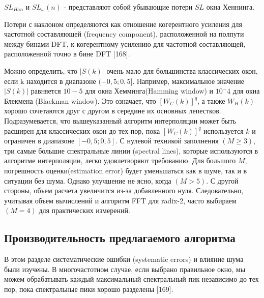 $S L_{Han}$ и $S L_\omega(n)$ - представляют собой убывающие потери $SL$ окна Хеннинга.

Потери с наклоном определяются как отношение когерентного усиления для частотной составляющей (frequency component), расположенной на полпути между бинами DFT, к когерентному усилению для частотной составляющей, расположенной точно в бине DFT [168].


Можно определить, что $|S(k)|$ очень мало 
для большинства классических окон, если k находится в диапазоне  $(-0,5;0,5]$. 
Например, максимальное значение $|S(k)|$ равняется $10-5$ для окна Хемминга(Hamming window) и $10^-4$ для окна Блекмена (Blackman window).
Это означает, что $[W_C (k)]^q$, а также $W_H (k)$ хорошо сочетаются друг с другом в середине их основных лепестков. 
Подразумевается, что вышеуказанный алгоритм интерполяции может быть расширен для классических окон до тех пор, пока $[W_C (k)]^q$ используется $k$ и ограничен в диапазоне $[-0,5;0,5]$. 
С нулевой техникой заполнения $(M\geq3)$, три самые большие спектральные линии (spectral lines), которые используются в алгоритме интерполяции, легко удовлетворяют требованию. Для большого $M$, погрешность оценки(estimation error) будет уменьшаться как в шуме, так и в ситуации без шума. Однако улучшение не ясно, когда $(M>5)$. С другой стороны, объем расчета увеличится из-за добавленного нуля. Следовательно, учитывая объем вычислений и алгоритм FFT для radix-2, часто выбираем $(M=4)$ для практических измерений.

\subsection{Производительность предлагаемого алгоритма
} \label{sec:ch2/sec5_3}

В этом разделе систематические ошибки (systematic errors) и влияние шума были изучены. В многочастотном случае, если выбрано правильное окно, мы можем обрабатывать каждый максимальный спектральный пик независимо до тех пор, пока спектральные пики хорошо разделены [169]. 


